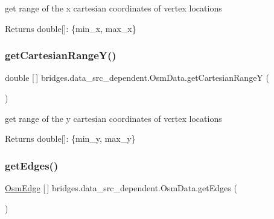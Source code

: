 get range of the x cartesian coordinates of vertex locations \begin{DoxyReturn}{Returns}
double\mbox{[}\mbox{]}\+: \{min\+\_\+x, max\+\_\+x\} 
\end{DoxyReturn}
\mbox{\label{classbridges_1_1data__src__dependent_1_1_osm_data_a66e066ca35c27f82190e94e6c530d635}} 
\subsubsection{\texorpdfstring{get\+Cartesian\+Range\+Y()}{getCartesianRangeY()}}
{\footnotesize\ttfamily double \mbox{[}$\,$\mbox{]} bridges.\+data\+\_\+src\+\_\+dependent.\+Osm\+Data.\+get\+Cartesian\+RangeY (\begin{DoxyParamCaption}{ }\end{DoxyParamCaption})}

get range of the y cartesian coordinates of vertex locations \begin{DoxyReturn}{Returns}
double\mbox{[}\mbox{]}\+: \{min\+\_\+y, max\+\_\+y\} 
\end{DoxyReturn}
\mbox{\label{classbridges_1_1data__src__dependent_1_1_osm_data_a1ceb1a4b7acd75ca655ad0769f6b427d}} 
\subsubsection{\texorpdfstring{get\+Edges()}{getEdges()}}
{\footnotesize\ttfamily \mbox{\hyperlink{classbridges_1_1data__src__dependent_1_1_osm_edge}{Osm\+Edge}} \mbox{[}$\,$\mbox{]} bridges.\+data\+\_\+src\+\_\+dependent.\+Osm\+Data.\+get\+Edges (\begin{DoxyParamCaption}{ }\end{DoxyParamCaption})}

